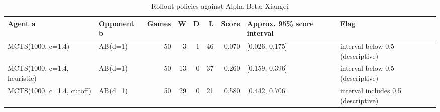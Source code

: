 \begin{table}[!t]
\centering
\caption{Rollout policies against Alpha-Beta: Xiangqi}
\label{tab:rollout_vs_ab_xiangqi}
\small
\begin{tabular}{llrrrrrll}
\toprule
Agent a & Opponent b & Games & W & D & L & Score & Approx. 95\% score interval & Flag \\
\midrule
MCTS(1000, c=1.4) & AB(d=1) & 50 & 3 & 1 & 46 & 0.070 & [0.026, 0.175] & interval below 0.5 (descriptive) \\
MCTS(1000, c=1.4, heuristic) & AB(d=1) & 50 & 13 & 0 & 37 & 0.260 & [0.159, 0.396] & interval below 0.5 (descriptive) \\
MCTS(1000, c=1.4, cutoff) & AB(d=1) & 50 & 29 & 0 & 21 & 0.580 & [0.442, 0.706] & interval includes 0.5 (descriptive) \\
\bottomrule
\end{tabular}
\end{table}
